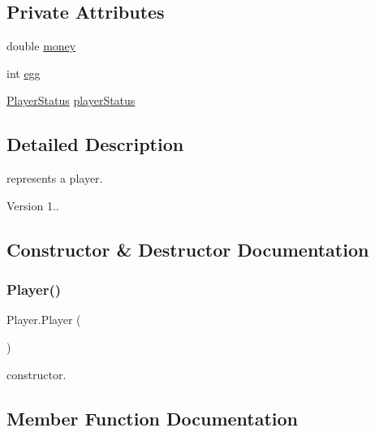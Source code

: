 \subsection*{Private Attributes}
\begin{DoxyCompactItemize}
\item 
double \mbox{\hyperlink{class_player_a80b07966d9359181ae196aa4179930a5}{money}}
\item 
int \mbox{\hyperlink{class_player_a9ed64c22212ad7526eca0903a05f9967}{egg}}
\item 
\mbox{\hyperlink{enum_player_1_1_player_status}{Player\+Status}} \mbox{\hyperlink{class_player_a022b57fd4b98752acacbbc5d1ec35e45}{player\+Status}}
\end{DoxyCompactItemize}


\subsection{Detailed Description}
represents a player. \begin{DoxyVersion}{Version}
1.. 
\end{DoxyVersion}


\subsection{Constructor \& Destructor Documentation}
\mbox{\label{class_player_a712a726b07cf901c040116d6d0c5cc66}} 
\subsubsection{\texorpdfstring{Player()}{Player()}}
{\footnotesize\ttfamily Player.\+Player (\begin{DoxyParamCaption}{ }\end{DoxyParamCaption})\hspace{0.3cm}{\ttfamily [inline]}}

constructor. 

\subsection{Member Function Documentation}
\mbox{\label{class_player_a32e700ea6b8d4792d24cd8a245c9706f}} 

